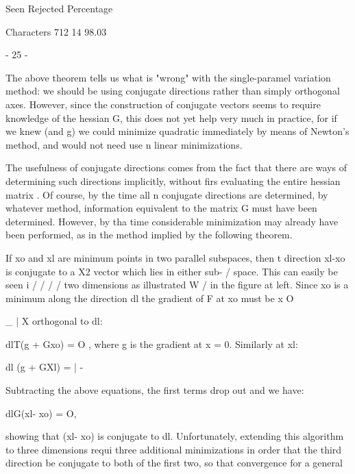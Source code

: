                  Seen Rejected  Percentage
 
Characters        712       14   98.03
 
                                - 25 -
 
 
     The above theorem tells us what is "wrong" with the single-paramel
variation method:  we should be using conjugate directions rather than
simply orthogonal axes.  However, since the construction of conjugate
vectors seems to require knowledge of the hessian G, this does not yet
help very much in practice, for if we knew  (and g) we could minimize
quadratic immediately by means of Newton's method, and would not need
use n linear minimizations.
 
     The usefulness of conjugate directions comes from the fact that
there are ways of determining such directions implicitly, without firs
evaluating the entire hessian matrix .  Of course, by the time all n
conjugate directions are determined, by whatever method, information
equivalent to the matrix G must have been determined.  However, by tha
time considerable minimization may already have been performed, as in
the method implied by the following theorem.
 
     If xo and xl are minimum points in two parallel subspaces, then t
                                    direction xl-xo is conjugate to a
      X2                          vector which lies in either sub-
                 /                 space. This can easily be seen i
              / / / /              two dimensions as illustrated
                 W /                in the figure at left. Since xo
                                    is a minimum along the direction
                 dl                 the gradient of F at xo must be
                 x O
 
         _                 | X     orthogonal to dl:
 
 
                          dlT(g + Gxo) = O ,
where g is the gradient at x = 0.  Similarly at xl:
 
 
                          dl (g + GXl) = | -
 
 
Subtracting the above equations, the first terms drop out and we have:
 
 
                          dlG(xl- xo) = O,
 
 
showing that (xl- xo) is conjugate to dl.
     Unfortunately, extending this algorithm to three dimensions requi
three additional minimizations in order that the third direction be
conjugate to both of the first two, so that convergence for a general
 
